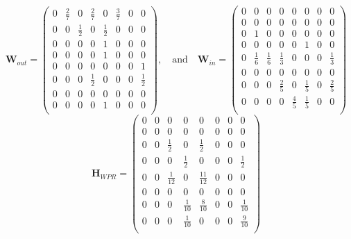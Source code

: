 \[\textbf{W}_{out}=\left(
\begin{array}{cccccccc}
0 & \frac{2}{7} & 0 & \frac{2}{7} & 0 &\frac{3}{7} & 0 & 0 \\
0 & 0 &\frac{1}{2}& 0 &\frac{1}{2}& 0 & 0 & 0\\
0 & 0 & 0 & 0 & 1 & 0 & 0 & 0\\
0 & 0 & 0 & 0 & 1 & 0 & 0 & 0\\
0 & 0 & 0 & 0 & 0 & 0 & 0 & 1\\
0 & 0 & 0 & \frac{1}{2} & 0 & 0 & 0 & \frac{1}{2} \\
0 & 0 & 0 & 0 & 0 & 0 & 0 & 0\\
0 & 0 & 0 & 0 & 1 & 0 & 0 & 0\\
\end{array}
\right) \mathrm{,}\quad\mathrm{and}\quad\textbf{W}_{in}=\left(
\begin{array}{cccccccc}
0 & 0 & 0 & 0 & 0 & 0 & 0 & 0 \\
0 & 0 & 0 & 0 & 0 & 0 & 0 & 0\\
0 & 1 & 0 & 0 & 0 & 0 & 0 & 0\\
0 & 0 & 0 & 0 & 0 & 1 & 0 & 0\\
0 & \frac{1}{6} & \frac{1}{6} & \frac{1}{3} & 0 & 0 & 0 & \frac{1}{3}\\
0 & 0 & 0 & 0 & 0 & 0 & 0 & 0 \\
0 & 0 & 0 & \frac{2}{5} & 0 & \frac{1}{5} & 0 & \frac{2}{5}\\
0 & 0 & 0 & 0 & \frac{4}{5} & \frac{1}{5} & 0 & 0\\
\end{array}
\right)	\]
\[\textbf{H}_{WPR}=\left(
\begin{array}{cccccccc}
0 & 0 & 0 & 0 & 0 & 0 & 0 & 0 \\
0 & 0 & 0 & 0 & 0 & 0 & 0 & 0\\
0 & 0 & \frac{1}{2} & 0 & \frac{1}{2} & 0 & 0 & 0\\
0 & 0 & 0 & \frac{1}{2} & 0 & 0 & 0 & \frac{1}{2}\\
0 & 0 & \frac{1}{12} & 0 & \frac{11}{12} & 0 & 0 & 0\\
0 & 0 & 0 & 0 & 0 & 0 & 0 & 0 \\
0 & 0 & 0 & \frac{1}{10} & \frac{8}{10} & 0 & 0 & \frac{1}{10}\\
0 & 0 & 0 & \frac{1}{10} & 0 & 0 & 0 & \frac{9}{10}\\
\end{array}
\right)	\]

